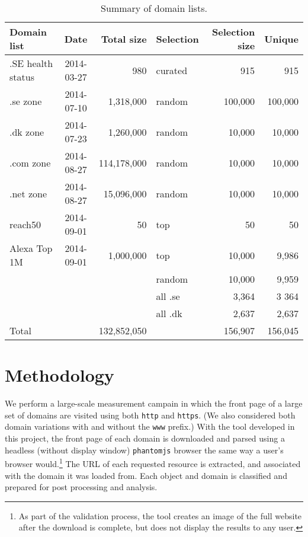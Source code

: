 \documentclass{sig-alternate-10pt}
\begin{document}
\begin{table*}[t]
\centering
\caption{Summary of domain lists.}
\label{tab:domains}
{\small
\begin{tabular}{|l|c|r|l|r|r|}\hline
\hline %
Domain list       & Date       & Total size  & Selection & Selection size & Unique\\\hline
.SE health status & 2014-03-27 & 980         & curated   & 915            & 915   \\\hline
.se zone          & 2014-07-10 & 1,318,000   & random    & 100,000        & 100,000 \\\hline
.dk zone          & 2014-07-23 & 1,260,000   & random    & 10,000         & 10,000 \\\hline
.com zone         & 2014-08-27 & 114,178,000 & random    & 10,000         & 10,000 \\\hline
.net zone         & 2014-08-27 & 15,096,000  & random    & 10,000         & 10,000 \\\hline
reach50           & 2014-09-01 & 50          & top       & 50             & 50 \\\hline
Alexa Top 1M      & 2014-09-01 & 1,000,000   & top       & 10,000         & 9,986 \\\hline
                  &            &             & random    & 10,000         & 9,959 \\\hline
                  &            &             & all .se   & 3,364          & 3 364 \\\hline
                  &            &             & all .dk   & 2,637          & 2,637 \\\hline
Total             &            & 132,852,050 &           & 156,907        & 156,045 \\\hline
\end{tabular}}
\vspace{-0pt}
\end{table*}


\section{Methodology}\label{sec:method}

We perform a large-scale measurement campain in which 
the front page of a large set of domains are visited
using both \texttt{http} and \texttt{https}.
(We also considered both domain variations 
with and without the \texttt{www} prefix.)
With the tool developed in this project,
the front page of each domain is downloaded and parsed 
using a headless (without display window) \texttt{phantomjs} browser 
the same way a user's browser would.\footnote{
As part of the validation process,
the tool creates an image of the full website after the download is complete,
but does not display the results to any user.}
The URL of each requested resource is extracted, and associated with
the domain it was loaded from. Each object and domain is classified 
and prepared for post processing and analysis.
\end{document}
